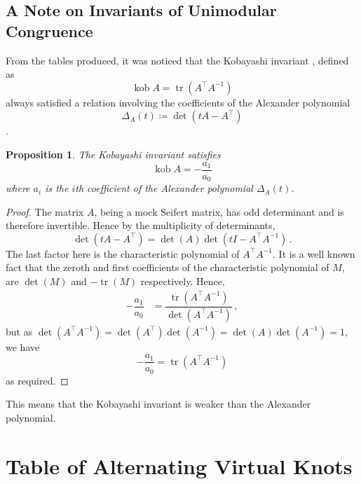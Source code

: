 \documentclass[12pt]{report}
\newcommand{\kob}{\operatorname{kob}}
\newtheorem*{proposition}{Proposition}
\begin{document}
\section{A Note on Invariants of Unimodular Congruence}

From the tables produced, it was noticed that the Kobayashi invariant \cite{new-invariant-under-congruence}, defined as
\[\kob A = \operatorname{tr}(A^{\top}A^{-1})\]
always satisfied a relation involving the coefficients of the Alexander polynomial
\[\Delta_{A}(t) \coloneq \det(tA - A^{\top})\] \cite{mock-seifert-matrices}.


\begin{proposition}
The Kobayashi invariant satisfies
\[\kob A = -\dfrac{a_{1}}{a_{0}}\]
where $a_{i}$ is the $i$th coefficient of the Alexander polynomial $\Delta_{A}(t)$.
\end{proposition}
\begin{proof}
The matrix $A$, being a mock Seifert matrix, has odd determinant \cite{mock-seifert-matrices} and is therefore invertible. Hence by the multiplicity of determinants,
\[\det(tA - A^{\top}) = \det(A)\det(tI - A^{\top}A^{-1})\,.\]
The last factor here is the characteristic polynomial of $A^{\top}A^{-1}$. It is a well known fact that the zeroth and first coefficients of the characteristic polynomial of $M$, are $\det(M)$ and $-\operatorname{tr}(M)$ respectively. Hence,
\begin{align*}
-\dfrac{a_{1}}{a_{0}}	& = \dfrac{\operatorname{tr}(A^{\top}A^{-1})}{\det(A^{\top}A^{-1})}\,,
\end{align*}
but as $\det(A^{\top}A^{-1}) = \det(A^{\top})\det(A^{-1}) = \det(A)\det(A^{-1}) = 1$, we have
\[-\dfrac{a_{1}}{a_{0}} = \operatorname{tr}(A^{\top}A^{-1})\]
as required.
\end{proof}

This means that the Kobayashi invariant is weaker than the Alexander polynomial.


\newpage
\printbibliography[title=References]


\appendix
{}
\titlespacing*{\chapter}{0pt}{40pt}{30pt}

\chapter{Table of Alternating Virtual Knots}
\end{document}
